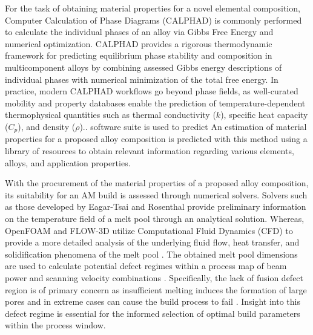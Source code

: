 For the task of obtaining material properties for a novel elemental composition,
Computer Calculation of Phase Diagrams \cite{kaufman_computer_1970} (CALPHAD) is
commonly performed to calculate the individual phases of an alloy via Gibbs Free
Energy and numerical optimization. CALPHAD provides a rigorous thermodynamic
framework for predicting equilibrium phase stability and composition in
multicomponent alloys by combining assessed Gibbs energy descriptions of
individual phases with numerical minimization of the total free energy. In
practice, modern CALPHAD workflows go beyond phase fields, as well-curated
mobility and property databases enable the prediction of temperature-dependent
thermophysical quantities such as thermal conductivity ($k$), specific heat
capacity ($C_p$), and density ($\rho$).\cite{gheribi_application_2012,
campbell_development_2014}. %
\cite{thermo-calc_software_thermo-calc_2025} software suite is used to predict
An estimation of material properties for a proposed alloy composition is
predicted with this method using a library of resources to obtain relevant
information regarding various elements, alloys, and application properties.

With the procurement of the material properties of a proposed alloy composition,
its suitability for an AM build is assessed through numerical solvers. Solvers
such as those developed by Eagar-Tsai \cite{eagar_temperature_1983} and
Rosenthal \cite{rosenthal_theory_2022} provide preliminary information on the
temperature field of a melt pool through an analytical solution. Whereas,
OpenFOAM \cite{openfoam_openfoam_2025} and FLOW-3D
\cite{flow_science_inc_flow-3d_2026} utilize Computational Fluid Dynamics (CFD)
to provide a more detailed analysis of the underlying fluid flow, heat transfer,
and solidification phenomena of the melt pool \cite{zhang_modeling_2019,
strayer_accelerating_2022}. The obtained melt pool dimensions are used to
calculate potential defect regimes within a process map of beam power and
scanning velocity combinations \cite{cunningham_analyzing_2017,
cunningham_defect_2018, tang_prediction_2017}. Specifically, the lack of fusion
defect region is of primary concern as insufficient melting induces the
formation of large pores and in extreme cases can cause the build process to
fail \cite{tang_prediction_2017}. Insight into this defect regime is essential
for the informed selection of optimal build parameters within the process
window.

